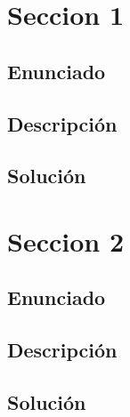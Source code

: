 \documentclass[11 pt]{article}
\begin{document}
\section{Seccion 1}

\subsection{Enunciado}


\subsection{Descripción}


\subsection{Solución}





\section{Seccion 2}

\subsection{Enunciado}


\subsection{Descripción}


\subsection{Solución}
\end{document}
